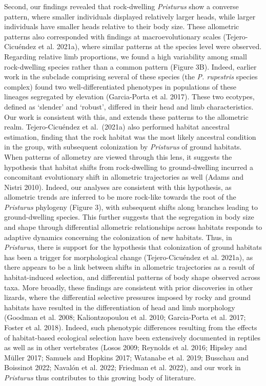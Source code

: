 \documentclass[
  11pt,
]{article}
\begin{document}
Second, our findings revealed that rock-dwelling \emph{Pristurus} show a
converse pattern, where smaller individuals displayed relatively larger
heads, while larger individuals have smaller heads relative to their
body size. These allometric patterns also corresponded with findings at
macroevolutionary scales (Tejero-Cicuéndez et al. 2021a), where similar
patterns at the species level were observed. Regarding relative limb
proportions, we found a high variability among small rock-dwelling
species rather than a common pattern (Figure 3B). Indeed, earlier work
in the subclade comprising several of these species (the \emph{P.
rupestris} species complex) found two well-differentiated phenotypes in
populations of these lineages segregated by elevation (Garcia-Porta et
al. 2017). These two ecotypes, defined as `slender' and `robust',
differed in their head and limb characteristics. Our work is consistent
with this, and extends these patterns to the allometric realm.
Tejero-Cicuéndez et al.~(2021a) also performed habitat ancestral
estimation, finding that the rock habitat was the most likely ancestral
condition in the group, with subsequent colonization by \emph{Pristurus}
of ground habitats. When patterns of allometry are viewed through this
lens, it suggests the hypothesis that habitat shifts from rock-dwelling
to ground-dwelling incurred a concomitant evolutionary shift in
allometric trajectories as well (Adams and Nistri 2010). Indeed, our
analyses are consistent with this hypothesis, as allometric trends are
inferred to be more rock-like towards the root of the \emph{Pristurus}
phylogeny (Figure 3), with subsequent shifts along branches leading to
ground-dwelling species. This further suggests that the segregation in
body size and shape through differential allometric relationships across
habitats responds to adaptive dynamics concerning the colonization of
new habitats. Thus, in \emph{Pristurus}, there is support for the
hypothesis that colonization of ground habitats has been a trigger for
morphological change (Tejero-Cicuéndez et al. 2021a), as there appears
to be a link between shifts in allometric trajectories as a result of
habitat-induced selection, and differential patterns of body shape
observed across taxa. More broadly, these findings are consistent with
prior discoveries in other lizards, where the differential selective
pressures imposed by rocky and ground habitats have resulted in the
differentiation of head and limb morphology (Goodman et al. 2008;
Kaliontzopoulou et al. 2010; Garcia-Porta et al. 2017; Foster et al.
2018). Indeed, such phenotypic differences resulting from the effects of
habitat-based ecological selection have been extensively documented in
reptiles as well as in other vertebrates (Losos 2009; Reynolds et al.
2016; Hipsley and Müller 2017; Samuels and Hopkins 2017; Watanabe et al.
2019; Busschau and Boissinot 2022; Navalón et al. 2022; Friedman et al.
2022), and our work in \emph{Pristurus} thus contributes to this growing
body of literature. \hfill\break
\end{document}
